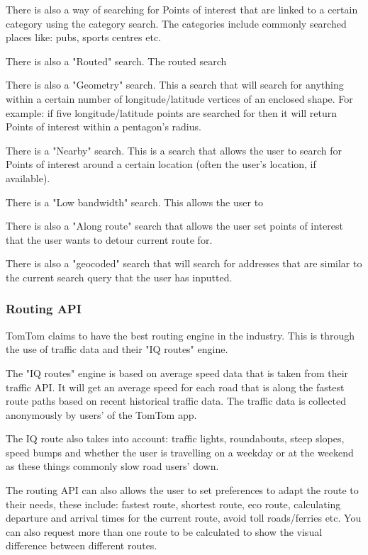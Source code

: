 \documentclass[12pt,a4paper]{article}
\begin{document}
There is also a way of searching for Points of interest that are linked to a certain category using the category search. The categories include commonly searched places like: pubs, sports centres etc.

There is also a "Routed" search. The routed search 

There is also a "Geometry" search. This a search that will search for anything within a certain number of longitude/latitude vertices of an enclosed shape. For example: if five longitude/latitude points are searched for then it will return Points of interest within a pentagon's radius. 

There is a "Nearby" search. This is a search that allows the user to search for Points of interest around a certain location (often the user's location, if available).

There is a "Low bandwidth" search. This allows the user to 

There is also a "Along route" search that allows the user set points of interest that the user wants to detour current route for. 

There is also a "geocoded" search that will search for addresses that are similar to the current search query that the user has inputted.

\subsubsection{Routing API}

TomTom claims to have the best routing engine in the industry. This is through the use of traffic data and their "IQ routes" engine.

The "IQ routes" engine is based on average speed data that is taken from their traffic API. It will get an average speed for each road that is along the fastest route paths based on recent historical traffic data. The traffic data is collected anonymously by users' of the TomTom app. 

The IQ route also takes into account: traffic lights, roundabouts, steep slopes, speed bumps and whether the user is travelling on a weekday or at the weekend as these things commonly slow road users' down.

The routing API can also allows the user to set preferences to adapt the route to their needs, these include: fastest route, shortest route, eco route, calculating departure and arrival times for the current route, avoid toll roads/ferries etc. You can also request more than one route to be calculated to show the visual difference between different routes.
\end{document}

